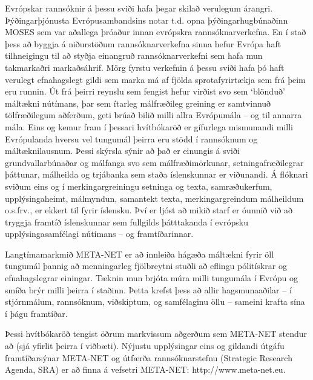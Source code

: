 \documentclass{../../metanetpaper}
\begin{document}
\begin{multicols}{2}
Evrópskar rannsóknir á þessu sviði hafa þegar skilað verulegum árangri. Þýðingarþjónusta Evrópusambandsins notar t.d. opna þýðingarhugbúnaðinn MOSES sem var aðallega þróaður innan evrópskra rannsóknarverkefna. En í stað þess að byggja á niðurstöðum rannsóknarverkefna sinna hefur Evrópa haft tilhneigingu til að styðja einangruð rannsóknarverkefni sem hafa mun takmarkaðri markaðsáhrif. Mörg fyrstu verkefnin á þessu sviði hafa þó haft verulegt efnahagslegt gildi sem marka má af fjölda sprotafyrirtækja sem frá þeim eru runnin.
Út frá þeirri reynslu sem fengist hefur virðist svo sem ‘blönduð’ máltækni nútímans, þar sem ítarleg málfræðileg greining er samtvinnuð tölfræðilegum aðferðum, geti brúað bilið milli allra Evrópumála -- og til annarra mála. Eins og kemur fram í þessari hvítbókaröð er gífurlega mismunandi milli Evrópulanda hversu vel tungumál þeirra eru stödd í rannsóknum og máltæknilausnum. Þessi skýrsla sýnir að það er einungis á sviði grundvallarbúnaðar og málfanga svo sem málfræðimörkunar, setningafræðilegrar þáttunar, málheilda og trjábanka sem staða íslenskunnar er viðunandi. Á flóknari sviðum eins og í merkingargreiningu setninga og texta, samræðukerfum, upplýsingaheimt, málmyndun, samantekt texta, merkingargreindum málheildum o.s.frv., er ekkert til fyrir íslensku. Því er ljóst að mikið starf er óunnið við að tryggja framtíð íslenskunnar sem fullgilds þátttakanda í evrópsku upplýsingasamfélagi nútímans -- og framtíðarinnar.

Langtímamarkmið META-NET er að innleiða hágæða máltækni fyrir öll tungumál þannig að menningarleg fjölbreytni stuðli að eflingu pólitískrar og efnahagslegrar einingar. Tæknin mun brjóta múra milli tungumála í Evrópu og smíða brýr milli þeirra í staðinn. Þetta krefst þess að allir hagsmunaaðilar -- í stjórnmálum, rannsóknum, viðskiptum, og samfélaginu öllu -- sameini krafta sína í þágu framtíðar. 

Þessi hvítbókaröð tengist öðrum markvissum aðgerðum sem META-NET stendur að (sjá yfirlit þeirra í viðbæti). Nýjustu upplýsingar eins og gildandi útgáfu framtíðarsýnar \cite{Meta1} META-NET og útfærða rannsóknarstefnu (Strategic Research Agenda, SRA) er að finna á vefsetri META-NET: http://www.meta-net.eu.
\end{multicols}

\clearpage


\end{document}
